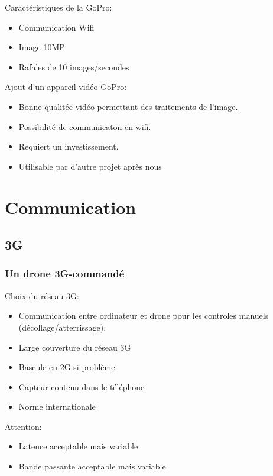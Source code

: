 \documentclass[transparent]{beamer}
\begin{document}
\begin{frame}
	\begin{block}{Caractéristiques de la GoPro:}
			\begin{itemize}
				\item Communication Wifi
				\item Image 10MP
				\item Rafales de 10 images/secondes
			\end{itemize}
	\end{block}
	\begin{block}{Ajout d'un appareil vidéo GoPro:}
			\begin{itemize}
				\item Bonne qualitée vidéo permettant des traitements de l'image.
				\item Possibilité de communicaton en wifi.
				\item Requiert un investissement.
				\item Utilisable par d'autre projet après nous
			\end{itemize}
	\end{block}
\end{frame}

\section{Communication}
\subsection{3G}

\begin{frame}
\frametitle{Un drone 3G-commandé}
	\begin{block}{Choix du réseau 3G:}
		\begin{itemize}
			\item Communication entre ordinateur et drone pour les controles manuels (décollage/atterrissage).
			\item Large couverture du réseau 3G
			\item Bascule en 2G si problème
			\item Capteur contenu dans le téléphone
			\item Norme internationale
		\end{itemize}
	\end{block}
	\begin{block}{Attention:}
		\begin{itemize}
			\item Latence acceptable mais variable
			\item Bande passante acceptable mais variable
		\end{itemize}
	\end{block}
\end{frame}
\end{document}
